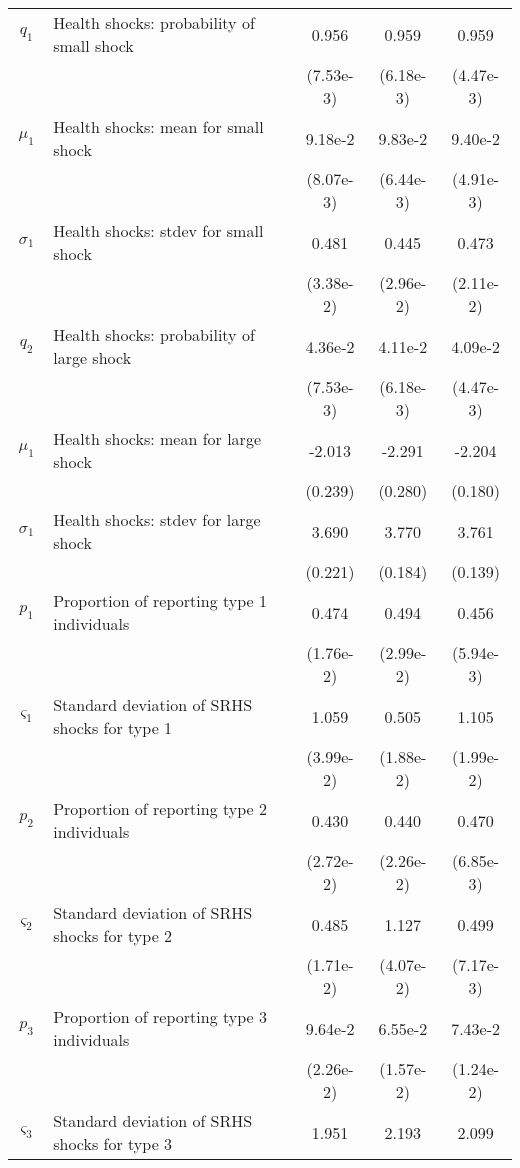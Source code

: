 \begin{table}
\begin{center}
{\begin{tabular}{clccc}
\rule{0pt}{2.2ex}$q_1$ & Health shocks: probability of small shock & 0.956 & 0.959 & 0.959 \\
\rule{0pt}{2.2ex} & & (7.53e-3) & (6.18e-3) & (4.47e-3) \\
\rule{0pt}{2.2ex}$\mu_1$ & Health shocks: mean for small shock & 9.18e-2 & 9.83e-2 & 9.40e-2 \\
\rule{0pt}{2.2ex} & & (8.07e-3) & (6.44e-3) & (4.91e-3) \\
\rule{0pt}{2.2ex}$\sigma_1$ & Health shocks: stdev for small shock & 0.481 & 0.445 & 0.473 \\
\rule{0pt}{2.2ex} & & (3.38e-2) & (2.96e-2) & (2.11e-2) \\
\rule{0pt}{2.2ex}$q_2$ & Health shocks: probability of large shock & 4.36e-2 & 4.11e-2 & 4.09e-2 \\
\rule{0pt}{2.2ex} & & (7.53e-3) & (6.18e-3) & (4.47e-3) \\
\rule{0pt}{2.2ex}$\mu_1$ & Health shocks: mean for large shock & -2.013 & -2.291 & -2.204 \\
\rule{0pt}{2.2ex} & & (0.239) & (0.280) & (0.180) \\
\rule{0pt}{2.2ex}$\sigma_1$ & Health shocks: stdev for large shock & 3.690 & 3.770 & 3.761 \\
\rule{0pt}{2.2ex} & & (0.221) & (0.184) & (0.139) \\
\hline
\rule{0pt}{2.2ex}$p_1$ & Proportion of reporting type 1 individuals & 0.474 & 0.494 & 0.456 \\
\rule{0pt}{2.2ex} & & (1.76e-2) & (2.99e-2) & (5.94e-3) \\
\rule{0pt}{2.2ex}$\varsigma_1$ & Standard deviation of SRHS shocks for type 1 & 1.059 & 0.505 & 1.105 \\
\rule{0pt}{2.2ex} & & (3.99e-2) & (1.88e-2) & (1.99e-2) \\
\rule{0pt}{2.2ex}$p_2$ & Proportion of reporting type 2 individuals & 0.430 & 0.440 & 0.470 \\
\rule{0pt}{2.2ex} & & (2.72e-2) & (2.26e-2) & (6.85e-3) \\
\rule{0pt}{2.2ex}$\varsigma_2$ & Standard deviation of SRHS shocks for type 2 & 0.485 & 1.127 & 0.499 \\
\rule{0pt}{2.2ex} & & (1.71e-2) & (4.07e-2) & (7.17e-3) \\
\rule{0pt}{2.2ex}$p_3$ & Proportion of reporting type 3 individuals & 9.64e-2 & 6.55e-2 & 7.43e-2 \\
\rule{0pt}{2.2ex} & & (2.26e-2) & (1.57e-2) & (1.24e-2) \\
\rule{0pt}{2.2ex}$\varsigma_3$ & Standard deviation of SRHS shocks for type 3 & 1.951 & 2.193 & 2.099 \\

\end{tabular}}
\end{center}
\end{table}
